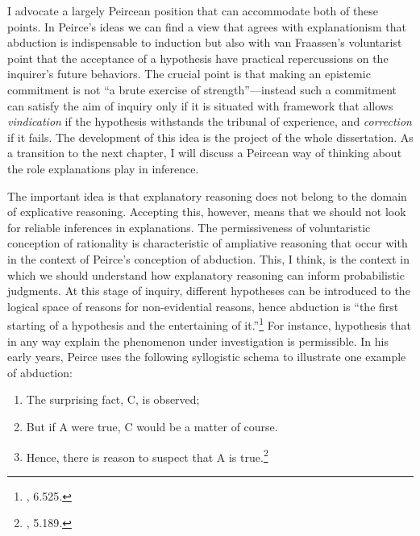 I advocate a largely Peircean position that can accommodate both of these points. In Peirce's ideas we can find a view that agrees with explanationism
that abduction is indispensable to induction but also with van
Fraassen's voluntarist point that the acceptance of a hypothesis have
practical repercussions on the inquirer's future behaviors. The crucial
point is that making an epistemic commitment is not ``a brute exercise
of strength''---instead such a commitment can satisfy the aim of inquiry
only if it is situated with framework that allows \emph{vindication} if
the hypothesis withstands the tribunal of experience, and
\emph{correction} if it fails. The development of this idea is the project of the whole dissertation. As a transition to the next chapter, I will discuss a Peircean way of thinking about the role explanations play in inference. 

The important idea is that explanatory reasoning does not belong to the domain of explicative reasoning. Accepting this, however, means that we should not look for reliable inferences in explanations. The permissiveness of voluntaristic conception of rationality is
characteristic of ampliative reasoning that occur with in the context of
Peirce's conception of abduction. This, I think, is the context in which we should understand how explanatory reasoning can inform probabilistic judgments. At this stage of inquiry, different
hypotheses can be introduced to the logical space of reasons for
non-evidential reasons, hence abduction is ``the first starting of a
hypothesis and the entertaining of it.''\footnote{\cite{CP}, 6.525.} For
instance, hypothesis that in any way explain the phenomenon under
investigation is permissible. In his early years, Peirce uses the
following syllogistic schema to illustrate one example of abduction:

\begin{enumerate}
\def\labelenumi{\arabic{enumi}.}
\tightlist
\item
  The surprising fact, C, is observed;
\item
  But if A were true, C would be a matter of course.
\item
  Hence, there is reason to suspect that A is true.\footnote{\cite{CP},
    5.189.}
\end{enumerate}

